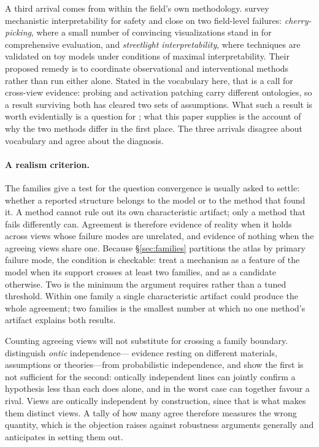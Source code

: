 \documentclass{article}
\begin{document}
A third arrival comes from within the field's own methodology.
\citet{bereska2024} survey mechanistic interpretability for safety and
close on two field-level failures: \emph{cherry-picking}, where a small
number of convincing visualizations stand in for comprehensive
evaluation, and \emph{streetlight interpretability}, where techniques are
validated on toy models under conditions of maximal interpretability.
Their proposed remedy is to coordinate observational and interventional
methods rather than run either alone.  Stated in the vocabulary here,
that is a call for cross-view evidence: probing and activation patching
carry different ontologies, so a result surviving both has cleared two
sets of assumptions.  What such a result is worth evidentially is a
question for \citet{tower2026mechvalidity}; what this paper supplies is
the account of why the two methods differ in the first place.  The three
arrivals disagree about vocabulary and agree about the diagnosis.

\paragraph{A realism criterion.}
The families give a test for the question convergence is usually asked to
settle: whether a reported structure belongs to the model or to the method
that found it.  A method cannot rule out its own characteristic artifact;
only a method that fails differently can.  Agreement is therefore evidence
of reality when it holds across views whose failure modes are unrelated,
and evidence of nothing when the agreeing views share one.  Because
\S\ref{sec:families} partitions the atlas by primary failure mode, the
condition is checkable: treat a mechanism as a feature of the model when
its support crosses at least two families, and as a candidate otherwise.
Two is the minimum the argument requires rather than a tuned threshold.
Within one family a single characteristic artifact could produce the whole
agreement; two families is the smallest number at which no one method's
artifact explains both results.

Counting agreeing views will not substitute for crossing a family
boundary.  \citet{stegenga2017} distinguish \emph{ontic} independence---%
evidence resting on different materials, assumptions or theories---from
probabilistic independence, and show the first is not sufficient for the
second: ontically independent lines can jointly confirm a hypothesis less
than each does alone, and in the worst case can together favour a rival.
Views are ontically independent by construction, since that is what makes
them distinct views.  A tally of how many agree therefore measures the
wrong quantity, which is the objection \citet{stegenga2009} raises against
robustness arguments generally and \citet{wimsatt1981} anticipates in
setting them out.
\end{document}
